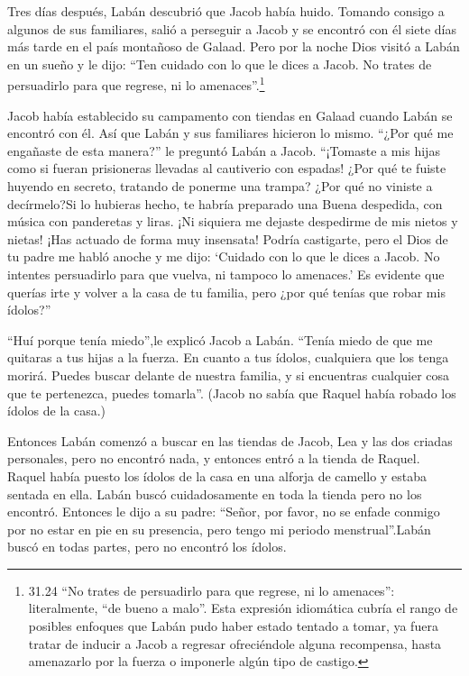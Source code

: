  Tres días después, Labán descubrió que Jacob había huido.
 Tomando consigo a algunos de sus familiares, salió a
perseguir a Jacob y se encontró con él siete días más tarde en el país
montañoso de Galaad.  Pero por la noche Dios visitó a Labán
en un sueño y le dijo: ``Ten cuidado con lo que le dices a Jacob. No
trates de persuadirlo para que regrese, ni lo amenaces''.\footnote{31.24
  ``No trates de persuadirlo para que regrese, ni lo amenaces'':
  literalmente, ``de bueno a malo''. Esta expresión idiomática cubría el
  rango de posibles enfoques que Labán pudo haber estado tentado a
  tomar, ya fuera tratar de inducir a Jacob a regresar ofreciéndole
  alguna recompensa, hasta amenazarlo por la fuerza o imponerle algún
  tipo de castigo.}

 Jacob había establecido su campamento con tiendas en
Galaad cuando Labán se encontró con él. Así que Labán y sus familiares
hicieron lo mismo.  ``¿Por qué me engañaste de esta
manera?'' le preguntó Labán a Jacob. ``¡Tomaste a mis hijas como si
fueran prisioneras llevadas al cautiverio con espadas! 
¿Por qué te fuiste huyendo en secreto, tratando de ponerme una trampa?
¿Por qué no viniste a decírmelo?Si lo hubieras hecho, te habría
preparado una Buena despedida, con música con panderetas y liras.
 ¡Ni siquiera me dejaste despedirme de mis nietos y nietas!
¡Has actuado de forma muy insensata!  Podría castigarte,
pero el Dios de tu padre me habló anoche y me dijo: `Cuidado con lo que
le dices a Jacob. No intentes persuadirlo para que vuelva, ni tampoco lo
amenaces.'  Es evidente que querías irte y volver a la casa
de tu familia, pero ¿por qué tenías que robar mis ídolos?''

 ``Huí porque tenía miedo'',le explicó Jacob a Labán.
``Tenía miedo de que me quitaras a tus hijas a la fuerza. 
En cuanto a tus ídolos, cualquiera que los tenga morirá. Puedes buscar
delante de nuestra familia, y si encuentras cualquier cosa que te
pertenezca, puedes tomarla''. (Jacob no sabía que Raquel había robado
los ídolos de la casa.)

 Entonces Labán comenzó a buscar en las tiendas de Jacob,
Lea y las dos criadas personales, pero no encontró nada, y entonces
entró a la tienda de Raquel.  Raquel había puesto los
ídolos de la casa en una alforja de camello y estaba sentada en ella.
Labán buscó cuidadosamente en toda la tienda pero no los encontró.
 Entonces le dijo a su padre: ``Señor, por favor, no se
enfade conmigo por no estar en pie en su presencia, pero tengo mi
periodo menstrual''.Labán buscó en todas partes, pero no encontró los
ídolos.

